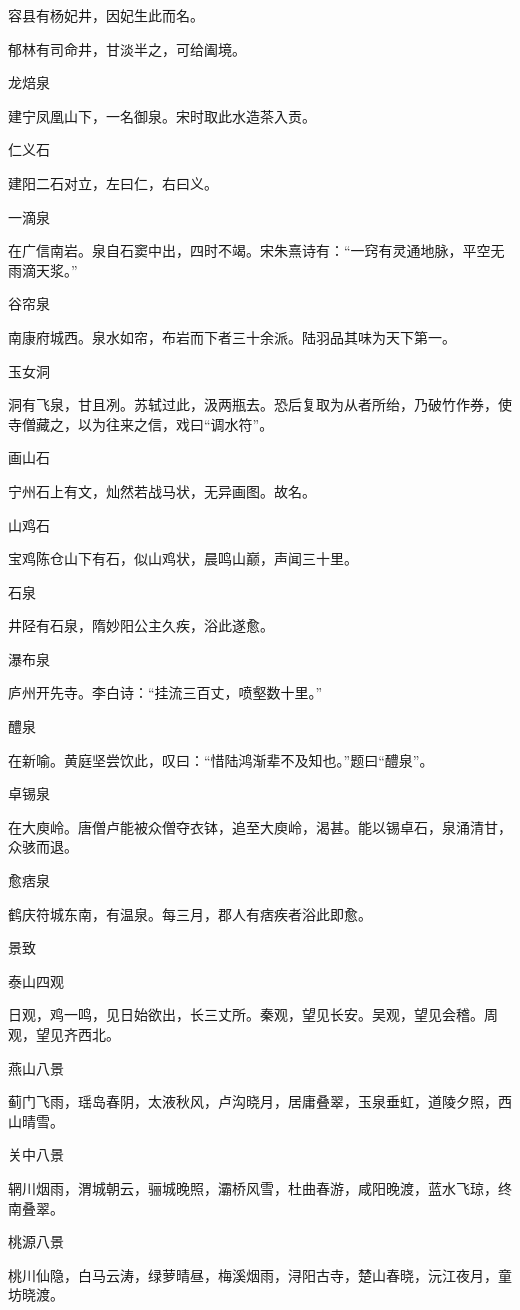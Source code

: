 \documentclass[a4paper,12pt,UTF8,twoside]{ctexbook}
\begin{document}
容县有杨妃井，因妃生此而名。

郁林有司命井，甘淡半之，可给阖境。

龙焙泉

建宁凤凰山下，一名御泉。宋时取此水造茶入贡。

仁义石

建阳二石对立，左曰仁，右曰义。

一滴泉

在广信南岩。泉自石窦中出，四时不竭。宋朱熹诗有：“一窍有灵通地脉，平空无雨滴天浆。”

谷帘泉

南康府城西。泉水如帘，布岩而下者三十余派。陆羽品其味为天下第一。

玉女洞

洞有飞泉，甘且冽。苏轼过此，汲两瓶去。恐后复取为从者所绐，乃破竹作券，使寺僧藏之，以为往来之信，戏曰“调水符”。

画山石

宁州石上有文，灿然若战马状，无异画图。故名。

山鸡石

宝鸡陈仓山下有石，似山鸡状，晨鸣山巅，声闻三十里。

石泉

井陉有石泉，隋妙阳公主久疾，浴此遂愈。

瀑布泉

庐州开先寺。李白诗：“挂流三百丈，喷壑数十里。”

醴泉

在新喻。黄庭坚尝饮此，叹曰：“惜陆鸿渐辈不及知也。”题曰“醴泉”。

卓锡泉

在大庾岭。唐僧卢能被众僧夺衣钵，追至大庾岭，渴甚。能以锡卓石，泉涌清甘，众骇而退。

愈痞泉

鹤庆符城东南，有温泉。每三月，郡人有痞疾者浴此即愈。

景致

泰山四观

日观，鸡一鸣，见日始欲出，长三丈所。秦观，望见长安。吴观，望见会稽。周观，望见齐西北。

燕山八景

蓟门飞雨，瑶岛春阴，太液秋风，卢沟晓月，居庸叠翠，玉泉垂虹，道陵夕照，西山晴雪。

关中八景

辋川烟雨，渭城朝云，骊城晚照，灞桥风雪，杜曲春游，咸阳晚渡，蓝水飞琼，终南叠翠。

桃源八景

桃川仙隐，白马云涛，绿萝晴昼，梅溪烟雨，浔阳古寺，楚山春晓，沅江夜月，童坊晓渡。
\end{document}
